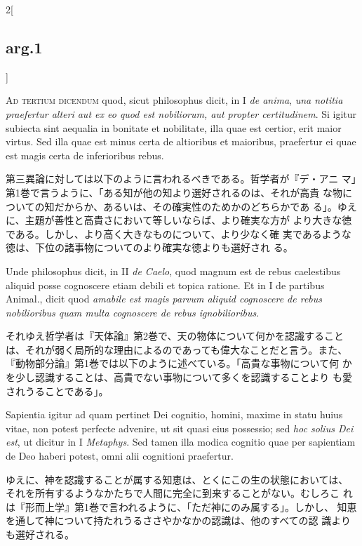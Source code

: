 \documentclass[paper=a4paper,fontsize=10pt,jafontsize=9pt,titlepage]{jlreq}
\begin{document}
\begin{paracol}{2}[\subsection{arg.1}]
\switchcolumn*[\subsection{ad.3}]

{\scshape Ad tertium dicendum} quod, sicut philosophus dicit, in I
{\itshape de anima}, {\itshape una notitia praefertur alteri aut ex eo
quod est nobiliorum, aut propter certitudinem}. Si igitur subiecta
sint aequalia in bonitate et nobilitate, illa quae est certior, erit
maior virtus. Sed illa quae est minus certa de altioribus et
maioribus, praefertur ei quae est magis certa de inferioribus rebus.

\switchcolumn

第三異論に対しては以下のように言われるべきである。哲学者が『デ・アニ
 マ」第1巻で言うように、「ある知が他の知より選好されるのは、それが高貴
 な物についての知だからか、あるいは、その確実性のためかのどちらかであ
 る」。ゆえに、主題が善性と高貴さにおいて等しいならば、より確実な方が
 より大きな徳である。しかし、より高く大きなものについて、より少なく確
 実であるような徳は、下位の諸事物についてのより確実な徳よりも選好され
 る。

\switchcolumn*

Unde philosophus dicit, in II {\itshape de Caelo}, quod magnum est de
rebus caelestibus aliquid posse cognoscere etiam debili et topica
ratione. Et in I de partibus Animal., dicit quod {\itshape amabile est
magis parvum aliquid cognoscere de rebus nobilioribus quam multa
cognoscere de rebus ignobilioribus}.

\switchcolumn

それゆえ哲学者は『天体論』第2巻で、天の物体について何かを認識すること
 は、それが弱く局所的な理由によるのであっても偉大なことだと言う。また、
 『動物部分論』第1巻では以下のように述べている。「高貴な事物について何
 かを少し認識することは、高貴でない事物について多くを認識することより
 も愛されうることである」。

\switchcolumn*

Sapientia igitur ad quam pertinet Dei cognitio, homini, maxime in
statu huius vitae, non potest perfecte advenire, ut sit quasi eius
possessio; sed {\itshape hoc solius Dei est}, ut dicitur in I
{\itshape Metaphys}. Sed tamen illa modica cognitio quae per
sapientiam de Deo haberi potest, omni alii cognitioni praefertur.

\switchcolumn

ゆえに、神を認識することが属する知恵は、とくにこの生の状態においては、
 それを所有するようなかたちで人間に完全に到来することがない。むしろこ
 れは『形而上学』第1巻で言われるように、「ただ神にのみ属する」。しかし、
 知恵を通して神について持たれうるささやかなかの認識は、他のすべての認
 識よりも選好される。


\end{paracol}
\end{document}

